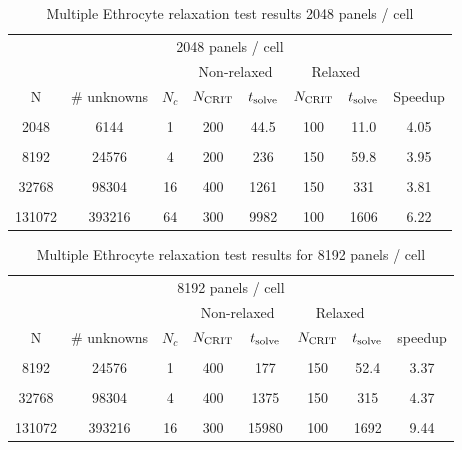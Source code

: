 \begin{table}[htdp]
\begin{center}
\begin{tabular}{c|c|c|cc|cc|c}

\multicolumn{8}{c}{2048 panels / cell} \\
& & & \multicolumn{2}{c}{Non-relaxed} & \multicolumn{2}{c}{Relaxed}\\
N & \# unknowns & $N_c$ & $N_{\text{CRIT}}$ & $t_{\text{solve}}$ & $N_{\text{CRIT}}$ & $t_{\text{solve}}$ & Speedup \\ \hline
& & & & & & &  \\
2048 & 6144 & 1 & 200 & 44.5 & 100 & 11.0 & 4.05 \\ 
& & & & & & &  \\
8192 & 24576 & 4 & 200 & 236 & 150 & 59.8 & 3.95 \\ 
& & & & & & &  \\
32768 & 98304 & 16 & 400 & 1261 & 150 & 331 & 3.81 \\
& & & & & & &  \\
131072 & 393216 & 64 & 300 & 9982\footnotemark[1] & 100 & 1606 & 6.22\footnotemark[1] \\

\end{tabular}
\end{center}
\caption{Multiple Ethrocyte relaxation test results 2048 panels / cell}
\label{tab:multiple_cell_relaxation_results_2048}
\end{table}


\begin{table}[htdp]
\begin{center}
\begin{tabular}{c|c|c|cc|cc|c}

\multicolumn{8}{c}{8192 panels / cell} \\
& & &  \multicolumn{2}{c}{Non-relaxed} & \multicolumn{2}{c}{Relaxed}\\
N & \# unknowns & $N_c$ & $N_{\text{CRIT}}$ & $t_{\text{solve}}$ & $N_{\text{CRIT}}$ & $t_{\text{solve}}$ & speedup \\ \hline
& & & & & & &  \\
8192 & 24576 & 1 & 400 & 177 & 150 & 52.4 & 3.37 \\ 
& & & & & & &  \\
32768 & 98304 & 4 & 400 & 1375 & 150 & 315 & 4.37 \\
& & & & & & &  \\
131072 & 393216 & 16 & 300 & 15980\footnotemark[1] & 100 & 1692 & 9.44\footnotemark[1] \\

\end{tabular}
\end{center}
\caption{Multiple Ethrocyte relaxation test results for 8192 panels / cell}
\label{tab:multiple_cell_relaxation_results_8192}
\end{table}

